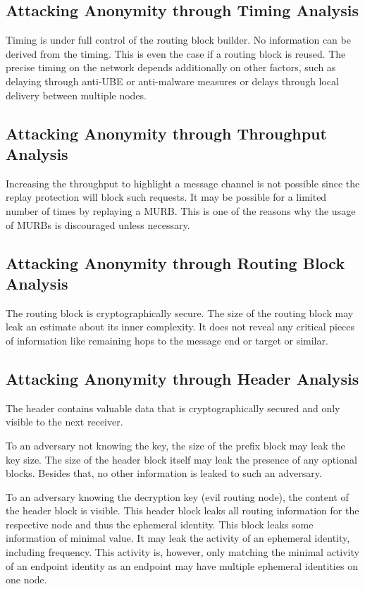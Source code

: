 \subsection{Attacking Anonymity through Timing Analysis}
Timing is under full control of the routing block builder. No information can be derived from the timing. This is even the case if a routing block is reused. The precise timing on the network depends additionally on other factors, such as delaying through anti-UBE or anti-malware measures or delays through local delivery between multiple nodes.

\subsection{Attacking Anonymity through Throughput Analysis}
Increasing the throughput to highlight a message channel is not possible since the replay protection will block such requests. It may be possible for a limited number of times by replaying a MURB. This is one of the reasons why the usage of MURBs is discouraged unless necessary.

\subsection{Attacking Anonymity through Routing Block Analysis}
The routing block is cryptographically secure. The size of the routing block may leak an estimate about its inner complexity. It does not reveal any critical pieces of information like remaining hops to the message end or target or similar.

\subsection{Attacking Anonymity through Header Analysis}
The header contains valuable data that is cryptographically secured and only visible to the next receiver. 

To an adversary not knowing the key, the size of the prefix block may leak the key size. The size of the header block itself may leak the presence of any optional blocks. Besides that, no other information is leaked to such an adversary.

To an adversary knowing the decryption key (evil routing node), the content of the header block is visible. This header block leaks all routing information for the respective node and thus the ephemeral identity. This block leaks some information of minimal value. It may leak the activity of an ephemeral identity, including frequency. This activity is, however, only matching the minimal activity of an endpoint identity as an endpoint may have multiple ephemeral identities on one node. 

